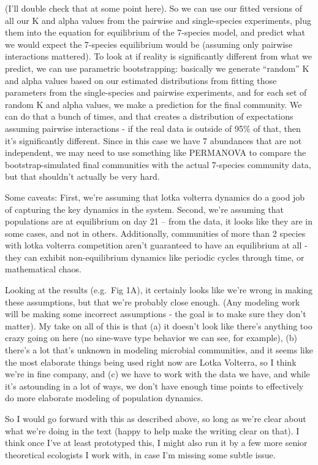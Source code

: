 \documentclass[
]{article}
\begin{document}
(I'll double check that at some point here). So we can use our fitted
versions of all our K and alpha values from the pairwise and
single-species experiments, plug them into the equation for equilibrium
of the 7-species model, and predict what we would expect the 7-species
equilibrium would be (assuming only pairwise interactions mattered). To
look at if reality is significantly different from what we predict, we
can use parametric bootstrapping: basically we generate ``random'' K and
alpha values based on our estimated distributions from fitting those
parameters from the single-species and pairwise experiments, and for
each set of random K and alpha values, we make a prediction for the
final community. We can do that a bunch of times, and that creates a
distribution of expectations assuming pairwise interactions - if the
real data is outside of 95\% of that, then it's significantly different.
Since in this case we have 7 abundances that are not independent, we may
need to use something like PERMANOVA to compare the bootstrap-simulated
final communities with the actual 7-species community data, but that
shouldn't actually be very hard.

Some caveats: First, we're assuming that lotka volterra dynamics do a
good job of capturing the key dynamics in the system. Second, we're
assuming that populations are at equilibrium on day 21 -- from the data,
it looks like they are in some cases, and not in others. Additionally,
communities of more than 2 species with lotka volterra competition
aren't guaranteed to have an equilibrium at all - they can exhibit
non-equilibrium dynamics like periodic cycles through time, or
mathematical chaos.

Looking at the results (e.g.~Fig 1A), it certainly looks like we're
wrong in making these assumptions, but that we're probably close enough.
(Any modeling work will be making some incorrect assumptions - the goal
is to make sure they don't matter). My take on all of this is that (a)
it doesn't look like there's anything too crazy going on here (no
sine-wave type behavior we can see, for example), (b) there's a lot
that's unknown in modeling microbial communities, and it seems like the
most elaborate things being used right now are Lotka Volterra, so I
think we're in fine company, and (c) we have to work with the data we
have, and while it's astounding in a lot of ways, we don't have enough
time points to effectively do more elaborate modeling of population
dynamics.

So I would go forward with this as described above, so long as we're
clear about what we're doing in the text (happy to help make the writing
clear on that). I think once I've at least prototyped this, I might also
run it by a few more senior theoretical ecologists I work with, in case
I'm missing some subtle issue.
\end{document}
